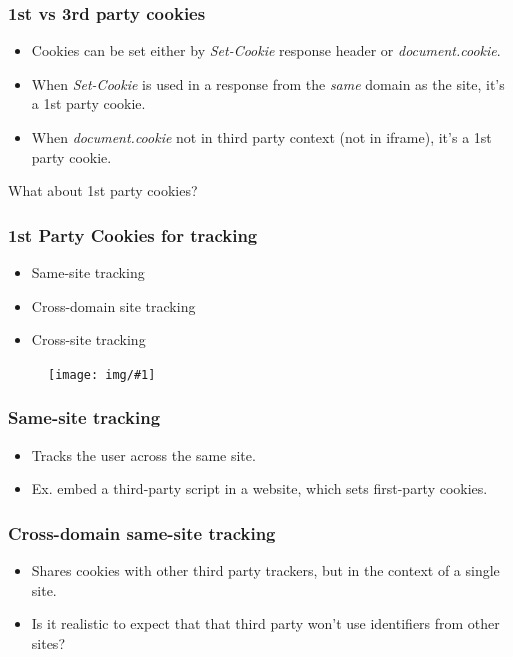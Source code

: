 \documentclass{beamer}
\newcommand{\pic}[1]{
\begin{figure}
\vspace{1cm}
\texttt{[image: img/\#1]}
\end{figure}
}
\begin{document}
\begin{frame}
\frametitle{1st vs 3rd party cookies}
\begin{itemize}
\item Cookies can be set either by \textit{Set-Cookie} response header or \textit{document.cookie}.
\item When \textit{Set-Cookie} is used in a response from the \textit{same} domain as the site, it's a 1st party cookie.
\item When \textit{document.cookie} not in third party context (not in iframe), it's a 1st party cookie.
\end{itemize}
\end{frame}

\begin{frame}
\centering
What about 1st party cookies?
\end{frame}


\begin{frame}
\frametitle{1st Party Cookies for tracking}

\begin{itemize}
\item Same-site tracking
\item Cross-domain site tracking
\item Cross-site tracking
\end{itemize}

\pic{cookietracking}
\end{frame}

\begin{frame}
\frametitle{Same-site tracking}
\begin{itemize}
\item Tracks the user across the same site.
\item Ex. embed a third-party script in a website, which sets first-party cookies.
\end{itemize}
\end{frame}

\begin{frame}
\frametitle{Cross-domain same-site tracking}
\begin{itemize}
\item Shares cookies with other third party trackers, but in the context of a single site.
\item Is it realistic to expect that that third party won't use identifiers from other sites?
\end{itemize}
\end{frame}
\end{document}
